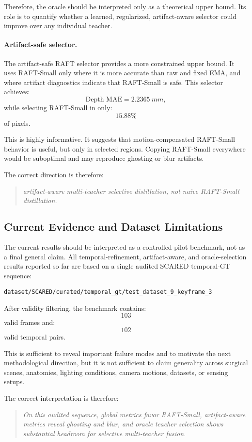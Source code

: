 \documentclass[11pt,a4paper]{article}
\begin{document}
Therefore, the oracle should be interpreted only as a theoretical upper bound. Its role is to quantify whether a learned, regularized, artifact-aware selector could improve over any individual teacher.

\paragraph{Artifact-safe selector.}
The artifact-safe RAFT selector provides a more constrained upper bound. It uses RAFT-Small only where it is more accurate than raw and fixed EMA, and where artifact diagnostics indicate that RAFT-Small is safe. This selector achieves:
\[
\text{Depth MAE}
=
\SI{2.2365}{mm},
\]
while selecting RAFT-Small in only:
\[
15.88\%
\]
of pixels.

This is highly informative. It suggests that motion-compensated RAFT-Small behavior is useful, but only in selected regions. Copying RAFT-Small everywhere would be suboptimal and may reproduce ghosting or blur artifacts.

The correct direction is therefore:
\begin{quote}
\emph{artifact-aware multi-teacher selective distillation, not naive RAFT-Small distillation.}
\end{quote}
\subsection{Current Evidence and Dataset Limitations}

The current results should be interpreted as a controlled pilot benchmark, not as a final general claim. All temporal-refinement, artifact-aware, and oracle-selection results reported so far are based on a single audited SCARED temporal-GT sequence:
\begin{lstlisting}
dataset/SCARED/curated/temporal_gt/test_dataset_9_keyframe_3
\end{lstlisting}

After validity filtering, the benchmark contains:
\[
103
\]
valid frames and:
\[
102
\]
valid temporal pairs.

This is sufficient to reveal important failure modes and to motivate the next methodological direction, but it is not sufficient to claim generality across surgical scenes, anatomies, lighting conditions, camera motions, datasets, or sensing setups.

The correct interpretation is therefore:
\begin{quote}
\emph{On this audited sequence, global metrics favor RAFT-Small, artifact-aware metrics reveal ghosting and blur, and oracle teacher selection shows substantial headroom for selective multi-teacher fusion.}
\end{quote}
\end{document}
